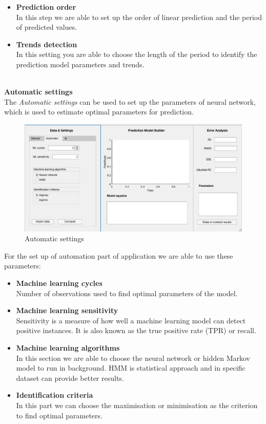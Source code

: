 \begin{itemize}
            \item \textbf{Prediction order}\\
            In this step we are able to set up the order of linear prediction and the
            period of predicted values.
            \item \textbf{Trends detection}\\
            In this setting you are able to choose the length of the period to 
            identify the prediction model parameters and trends.
        \end{itemize}
        \noindent
        \\
        \textbf{Automatic settings}\\
        The \emph{Automatic settings} can be used to set up the parameters of neural network,
        which is used to estimate optimal parameters for prediction. 
       \begin{figure}[h!]
        \centering
            \includegraphics[width=\textwidth]{figures/auto.png}
            \caption{Automatic settings}
            \label{fig:automatic}
    \end{figure}
                For the set up of automation part of application we are able to use these parameters:\\
        \begin{itemize}
            \item \textbf{Machine learning cycles}\\
            Number of observations used to find optimal parameters of the model.
            \item \textbf{Machine learning sensitivity}\\
            Sensitivity is a measure of how well a machine learning model can
            detect positive instances. It is also known as the true positive rate
            (TPR) or recall.
            \item \textbf{Machine learning algorithms}\\
            In this section we are able to choose the neural network or hidden Markov model
            to run in background. HMM is statistical approach and in specific dataset can provide
            better results.
            \item \textbf{Identification criteria}\\
            In this part we can choose the maximisation or minimisation as the criterion
            to find optimal parameters.
        \end{itemize}
   
